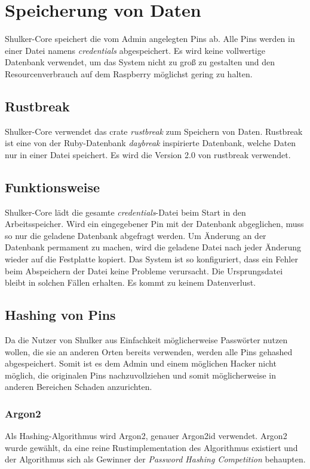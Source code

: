 \chapter{Speicherung von Daten}
Shulker-Core speichert die vom Admin angelegten Pins ab. Alle Pins werden in einer Datei namens \textit{credentials} abgespeichert.
Es wird keine vollwertige Datenbank verwendet, um das System nicht zu groß zu gestalten und den Resourcenverbrauch auf dem 
Raspberry möglichst gering zu halten.

\section{Rustbreak}
Shulker-Core verwendet das crate \textit{rustbreak} zum Speichern von Daten. Rustbreak ist eine von der Ruby-Datenbank \textit{daybreak} inspirierte
Datenbank, welche Daten nur in einer Datei speichert. Es wird die Version 2.0 von rustbreak verwendet.

\section{Funktionsweise}
Shulker-Core lädt die gesamte \textit{credentials}-Datei beim Start in den Arbeitsspeicher. Wird ein eingegebener Pin
mit der Datenbank abgeglichen, muss so nur die geladene Datenbank abgefragt werden. Um Änderung an der Datenbank permament zu 
machen, wird die geladene Datei nach jeder Änderung wieder auf die Festplatte kopiert. Das System ist so konfiguriert, dass
ein Fehler beim Abspeichern der Datei keine Probleme verursacht. Die Ursprungsdatei bleibt in solchen Fällen erhalten. Es kommt 
zu keinem Datenverlust.

\section{Hashing von Pins}
Da die Nutzer von Shulker aus Einfachkeit möglicherweise Passwörter nutzen wollen, die sie an anderen Orten bereits verwenden, werden
alle Pins gehashed abgespeichert. Somit ist es dem Admin und einem möglichen Hacker nicht möglich, die originalen Pins nachzuvollziehen und
somit möglicherweise in anderen Bereichen Schaden anzurichten.

\subsection{Argon2}
Als Hashing-Algorithmus wird Argon2, genauer Argon2id verwendet. Argon2 wurde gewählt, da eine reine Rustimplementation des Algorithmus
existiert und der Algorithmus sich als Gewinner der \textit{Password Hashing Competition} behaupten.

